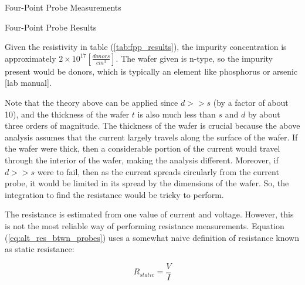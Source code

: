 
\FloatBarrier

\begin{table}[h!]
\centering
\caption{Four-Point Probe Measurements}
\label{tab:fpp_measure}
\end{table}

\FloatBarrier

\begin{table}[h!]
\centering
\caption{Four-Point Probe Results}
\label{tab:fpp_results}
\end{table}

\FloatBarrier

Given the resistivity in table (\ref{tab:fpp_results}), the impurity concentration is approximately $2 \times 10^{17} [\frac{donors}{cm^3}]$. The wafer given is n-type, so the impurity present would be donors, which is typically an element like phosphorus or arsenic [lab manual].

Note that the theory above can be applied since $d >> s$ (by a factor of about 10), and the thickness of the wafer $t$ is also much less than $s$ and $d$ by about three orders of magnitude. The thickness of the wafer is crucial because the above analysis assumes that the current largely travels along the surface of the wafer. If the wafer were thick, then a considerable portion of the current would travel through the interior of the wafer, making the analysis different. Moreover, if $d >> s$ were to fail, then as the current spreads circularly from the current probe, it would be limited in its spread by the dimensions of the wafer. So, the integration to find the resistance would be tricky to perform.%



The resistance is estimated from one value of current and voltage. However, this is not the most reliable way of performing resistance measurements.
Equation (\ref{eq:alt_res_btwn_probes}) uses a somewhat naive definition of resistance known as static resistance:

\begin{equation}
	\label{eq:static_res_def}
	R_{static} = \frac{V}{I}
\end{equation}

